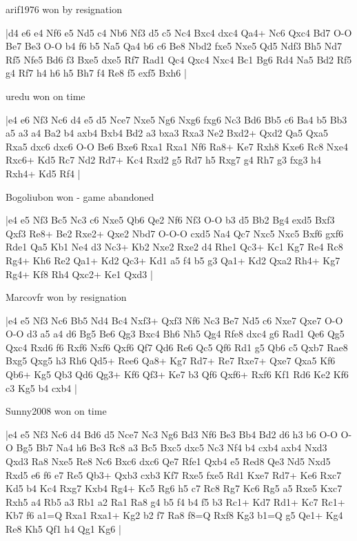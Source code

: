 arif1976 won by resignation

\makegametitle
|d4 e6 e4 Nf6 e5 Nd5 c4 Nb6 Nf3 d5 c5 Nc4 Bxc4 dxc4 Qa4+ Nc6 Qxc4 Bd7 O-O Be7 Be3 O-O b4 f6 b5 Na5 Qa4 b6 c6 Be8 Nbd2 fxe5 Nxe5 Qd5 Ndf3 Bh5 Nd7 Rf5 Nfe5 Bd6 f3 Bxe5 dxe5 Rf7 Rad1 Qc4 Qxc4 Nxc4 Bc1 Bg6 Rd4 Na5 Bd2 Rf5 g4 Rf7 h4 h6 h5 Bh7 f4 Re8 f5 exf5 Bxh6  |

\showboard

uredu won on time

\makegametitle
|e4 e6 Nf3 Nc6 d4 e5 d5 Nce7 Nxe5 Ng6 Nxg6 fxg6 Nc3 Bd6 Bb5 c6 Ba4 b5 Bb3 a5 a3 a4 Ba2 b4 axb4 Bxb4 Bd2 a3 bxa3 Rxa3 Ne2 Bxd2+ Qxd2 Qa5 Qxa5 Rxa5 dxc6 dxc6 O-O Be6 Bxe6 Rxa1 Rxa1 Nf6 Ra8+ Ke7 Rxh8 Kxe6 Rc8 Nxe4 Rxc6+ Kd5 Rc7 Nd2 Rd7+ Kc4 Rxd2 g5 Rd7 h5 Rxg7 g4 Rh7 g3 fxg3 h4 Rxh4+ Kd5 Rf4  |

\showboard

Bogoliubon won - game abandoned

\makegametitle
|e4 e5 Nf3 Bc5 Nc3 c6 Nxe5 Qb6 Qe2 Nf6 Nf3 O-O b3 d5 Bb2 Bg4 exd5 Bxf3 Qxf3 Re8+ Be2 Rxe2+ Qxe2 Nbd7 O-O-O cxd5 Na4 Qc7 Nxc5 Nxc5 Bxf6 gxf6 Rde1 Qa5 Kb1 Ne4 d3 Nc3+ Kb2 Nxe2 Rxe2 d4 Rhe1 Qc3+ Kc1 Kg7 Re4 Rc8 Rg4+ Kh6 Re2 Qa1+ Kd2 Qc3+ Kd1 a5 f4 b5 g3 Qa1+ Kd2 Qxa2 Rh4+ Kg7 Rg4+ Kf8 Rh4 Qxc2+ Ke1 Qxd3  |

\showboard

Marcovfr won by resignation

\makegametitle
|e4 e5 Nf3 Nc6 Bb5 Nd4 Bc4 Nxf3+ Qxf3 Nf6 Nc3 Be7 Nd5 c6 Nxe7 Qxe7 O-O O-O d3 a5 a4 d6 Bg5 Be6 Qg3 Bxc4 Bh6 Nh5 Qg4 Rfe8 dxc4 g6 Rad1 Qe6 Qg5 Qxc4 Rxd6 f6 Rxf6 Nxf6 Qxf6 Qf7 Qd6 Re6 Qc5 Qf6 Rd1 g5 Qb6 c5 Qxb7 Rae8 Bxg5 Qxg5 h3 Rh6 Qd5+ Ree6 Qa8+ Kg7 Rd7+ Re7 Rxe7+ Qxe7 Qxa5 Kf6 Qb6+ Kg5 Qb3 Qd6 Qg3+ Kf6 Qf3+ Ke7 b3 Qf6 Qxf6+ Rxf6 Kf1 Rd6 Ke2 Kf6 c3 Kg5 b4 cxb4  |

\showboard

Sunny2008 won on time

\makegametitle
|e4 e5 Nf3 Nc6 d4 Bd6 d5 Nce7 Nc3 Ng6 Bd3 Nf6 Be3 Bb4 Bd2 d6 h3 b6 O-O O-O Bg5 Bb7 Na4 h6 Be3 Rc8 a3 Bc5 Bxc5 dxc5 Nc3 Nf4 b4 cxb4 axb4 Nxd3 Qxd3 Ra8 Nxe5 Re8 Nc6 Bxc6 dxc6 Qe7 Rfe1 Qxb4 e5 Red8 Qe3 Nd5 Nxd5 Rxd5 e6 f6 e7 Re5 Qb3+ Qxb3 cxb3 Kf7 Rxe5 fxe5 Rd1 Kxe7 Rd7+ Ke6 Rxc7 Kd5 b4 Kc4 Rxg7 Kxb4 Rg4+ Kc5 Rg6 h5 c7 Rc8 Rg7 Kc6 Rg5 a5 Rxe5 Kxc7 Rxh5 a4 Rb5 a3 Rb1 a2 Ra1 Ra8 g4 b5 f4 b4 f5 b3 Rc1+ Kd7 Rd1+ Kc7 Rc1+ Kb7 f6 a1=Q Rxa1 Rxa1+ Kg2 b2 f7 Ra8 f8=Q Rxf8 Kg3 b1=Q g5 Qe1+ Kg4 Re8 Kh5 Qf1 h4 Qg1 Kg6  |

